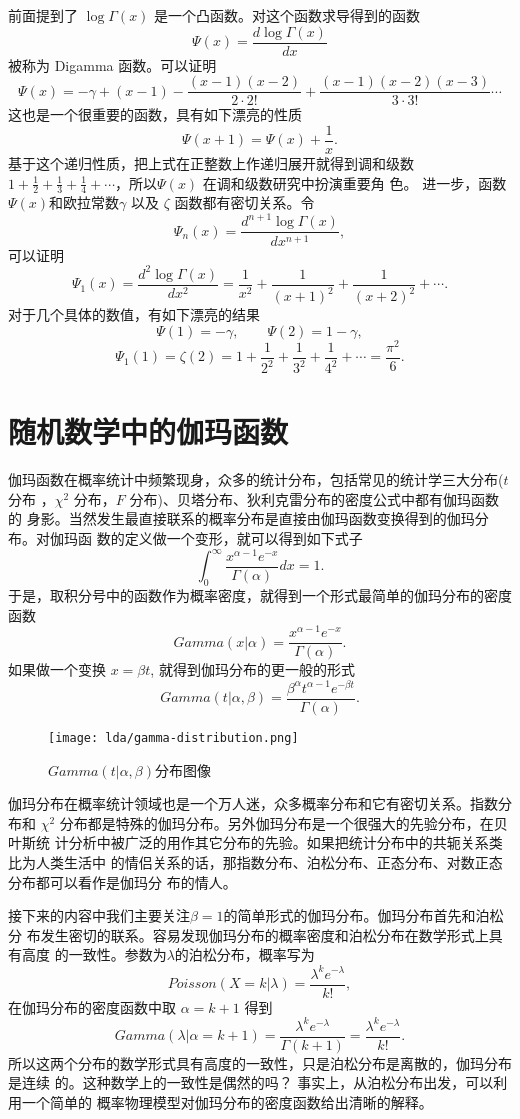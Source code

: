 {前面提到了 $\log\Gamma(x)$ 是一个凸函数。对这个函数求导得到的函数
$$ \Psi(x) = \frac{d\log\Gamma(x)}{dx}  $$
被称为 Digamma 函数。可以证明
$$\Psi(x) = -\gamma + (x-1) - \frac{(x-1)(x-2)}{2\cdot 2!} 
+ \frac{(x-1)(x-2)(x-3)}{3\cdot 3!} \cdots $$
这也是一个很重要的函数，具有如下漂亮的性质
$$ \Psi(x+1) = \Psi(x) + \frac{1}{x} .$$
基于这个递归性质，把上式在正整数上作递归展开就得到调和级数 $1+\frac{1}{2} +
\frac{1}{3} + \frac{1}{4} + \cdots $，所以$\Psi(x)$ 在调和级数研究中扮演重要角
色。 进一步，函数$\Psi(x)$和欧拉常数$\gamma$ 以及 $\zeta$ 函数都有密切关系。令
$$ \Psi_n(x) = \frac{d^{n+1}\log\Gamma(x)}{dx^{n+1}} ,$$
可以证明
$$\Psi_1(x) = \frac{d^{2}\log\Gamma(x)}{dx^{2}}
= \frac{1}{x^2} + \frac{1}{(x+1)^2} + \frac{1}{(x+2)^2} + \cdots .$$
对于几个具体的数值，有如下漂亮的结果
$$\Psi(1) = -\gamma, \quad \quad \Psi(2) = 1-\gamma ,$$
$$\Psi_1(1) = \zeta(2) = 1 + \frac{1}{2^2} + \frac{1}{3^2} + \frac{1}{4^2} +  \cdots 
= \frac{\pi^2}{6} .$$


\section{随机数学中的伽玛函数}

伽玛函数在概率统计中频繁现身，众多的统计分布，包括常见的统计学三大分布($t$ 分布
，$\chi^2$ 分布，$F$ 分布)、贝塔分布、狄利克雷分布的密度公式中都有伽玛函数的
身影。当然发生最直接联系的概率分布是直接由伽玛函数变换得到的伽玛分布。对伽玛函
数的定义做一个变形，就可以得到如下式子
$$ \int_0^{\infty} \frac{x^{\alpha-1}e^{-x}}{\Gamma(\alpha)}dx = 1 .$$
于是，取积分号中的函数作为概率密度，就得到一个形式最简单的伽玛分布的密度函数
$$Gamma(x|\alpha) = \frac{x^{\alpha-1}e^{-x}}{\Gamma(\alpha)} .$$
如果做一个变换 $x=\beta t$, 就得到伽玛分布的更一般的形式
$$Gamma(t|\alpha, \beta) = \frac{\beta^\alpha t^{\alpha-1}e^{-\beta t}}{\Gamma(\alpha)} .$$

\begin{figure}[htbp]
\centering
\texttt{[image: lda/gamma-distribution.png]}
\caption{$Gamma(t|\alpha,\beta)$分布图像}
\end{figure}

伽玛分布在概率统计领域也是一个万人迷，众多概率分布和它有密切关系。指数分布和
$\chi^2$ 分布都是特殊的伽玛分布。另外伽玛分布是一个很强大的先验分布，在贝叶斯统
计分析中被广泛的用作其它分布的先验。如果把统计分布中的共轭关系类比为人类生活中
的情侣关系的话，那指数分布、泊松分布、正态分布、对数正态分布都可以看作是伽玛分
布的情人。

接下来的内容中我们主要关注$\beta = 1$的简单形式的伽玛分布。伽玛分布首先和泊松分
布发生密切的联系。容易发现伽玛分布的概率密度和泊松分布在数学形式上具有高度
的一致性。参数为$\lambda$的泊松分布，概率写为
$$Poisson(X=k|\lambda) = \frac{\lambda^k e^{-\lambda}}{k!} , $$
在伽玛分布的密度函数中取 $\alpha = k+1$ 得到
$$ Gamma(\lambda|\alpha=k+1) 
= \frac{\lambda^ke^{-\lambda}}{\Gamma(k+1)}= \frac{\lambda^k e^{-\lambda}}{k!} . $$
所以这两个分布的数学形式具有高度的一致性，只是泊松分布是离散的，伽玛分布是连续
的。这种数学上的一致性是偶然的吗？ 事实上，从泊松分布出发，可以利用一个简单的
概率物理模型对伽玛分布的密度函数给出清晰的解释。

}

